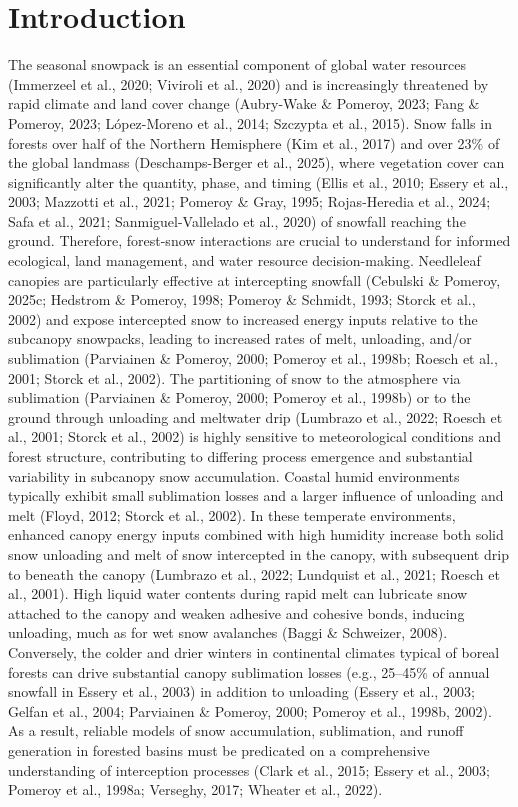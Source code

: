 \documentclass[
]{agujournal2019}
\begin{document}
\section{Introduction}\label{introduction}

The seasonal snowpack is an essential component of global water
resources (Immerzeel et al., 2020; Viviroli et al., 2020) and is
increasingly threatened by rapid climate and land cover change
(Aubry-Wake \& Pomeroy, 2023; Fang \& Pomeroy, 2023; López-Moreno et
al., 2014; Szczypta et al., 2015). Snow falls in forests over half of
the Northern Hemisphere (Kim et al., 2017) and over 23\% of the global
landmass (Deschamps-Berger et al., 2025), where vegetation cover can
significantly alter the quantity, phase, and timing (Ellis et al., 2010;
Essery et al., 2003; Mazzotti et al., 2021; Pomeroy \& Gray, 1995;
Rojas-Heredia et al., 2024; Safa et al., 2021; Sanmiguel-Vallelado et
al., 2020) of snowfall reaching the ground. Therefore, forest-snow
interactions are crucial to understand for informed ecological, land
management, and water resource decision-making. Needleleaf canopies are
particularly effective at intercepting snowfall (Cebulski \& Pomeroy,
2025c; Hedstrom \& Pomeroy, 1998; Pomeroy \& Schmidt, 1993; Storck et
al., 2002) and expose intercepted snow to increased energy inputs
relative to the subcanopy snowpacks, leading to increased rates of melt,
unloading, and/or sublimation (Parviainen \& Pomeroy, 2000; Pomeroy et
al., 1998b; Roesch et al., 2001; Storck et al., 2002). The partitioning
of snow to the atmosphere via sublimation (Parviainen \& Pomeroy, 2000;
Pomeroy et al., 1998b) or to the ground through unloading and meltwater
drip (Lumbrazo et al., 2022; Roesch et al., 2001; Storck et al., 2002)
is highly sensitive to meteorological conditions and forest structure,
contributing to differing process emergence and substantial variability
in subcanopy snow accumulation. Coastal humid environments typically
exhibit small sublimation losses and a larger influence of unloading and
melt (Floyd, 2012; Storck et al., 2002). In these temperate
environments, enhanced canopy energy inputs combined with high humidity
increase both solid snow unloading and melt of snow intercepted in the
canopy, with subsequent drip to beneath the canopy (Lumbrazo et al.,
2022; Lundquist et al., 2021; Roesch et al., 2001). High liquid water
contents during rapid melt can lubricate snow attached to the canopy and
weaken adhesive and cohesive bonds, inducing unloading, much as for wet
snow avalanches (Baggi \& Schweizer, 2008). Conversely, the colder and
drier winters in continental climates typical of boreal forests can
drive substantial canopy sublimation losses (e.g., 25--45\% of annual
snowfall in Essery et al., 2003) in addition to unloading (Essery et
al., 2003; Gelfan et al., 2004; Parviainen \& Pomeroy, 2000; Pomeroy et
al., 1998b, 2002). As a result, reliable models of snow accumulation,
sublimation, and runoff generation in forested basins must be predicated
on a comprehensive understanding of interception processes (Clark et
al., 2015; Essery et al., 2003; Pomeroy et al., 1998a; Verseghy, 2017;
Wheater et al., 2022).
\end{document}
